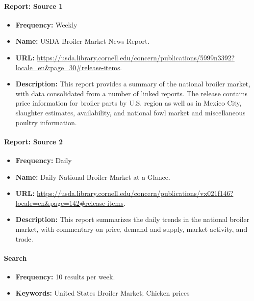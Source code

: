 \paragraph{Report: Source 1}
\begin{itemize}
    \item \textbf{Frequency:} Weekly
    \item \textbf{Name:} USDA Broiler Market News Report.
    
    \item \textbf{URL:} \url{https://usda.library.cornell.edu/concern/publications/5999n3392?locale=en&page=30#release-items}.
    
    \item \textbf{Description:} This report provides a summary of the national broiler market, with data consolidated from a number of linked reports. The release contains price information for broiler parts by U.S. region as well as in Mexico City, slaughter estimates, availability, and national fowl market and miscellaneous poultry information.
\end{itemize}

\paragraph{Report: Source 2}
\begin{itemize}
    \item \textbf{Frequency:} Daily
    \item \textbf{Name:} Daily National Broiler Market at a Glance.
    
    \item \textbf{URL:} \url{https://usda.library.cornell.edu/concern/publications/vx021f146?locale=en&page=142#release-items}.
    
    \item \textbf{Description:} This report summarizes the daily trends in the national broiler market, with commentary on price, demand and supply, market activity, and trade.
\end{itemize}
\paragraph{Search}
\begin{itemize}
    \item \textbf{Frequency:} 10 results per week.
    \item \textbf{Keywords:} United States Broiler Market; Chicken prices 
\end{itemize}


